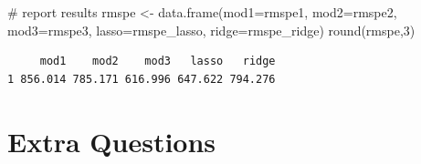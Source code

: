 \documentclass[
  letterpaper,
  DIV=11,
  numbers=noendperiod]{scrreprt}
\newenvironment{Shaded}{\begin{snugshade}}{\end{snugshade}}
\newcommand{\AttributeTok}[1]{\textcolor[rgb]{0.40,0.45,0.13}{#1}}
\newcommand{\CommentTok}[1]{\textcolor[rgb]{0.37,0.37,0.37}{#1}}
\newcommand{\DecValTok}[1]{\textcolor[rgb]{0.68,0.00,0.00}{#1}}
\newcommand{\FunctionTok}[1]{\textcolor[rgb]{0.28,0.35,0.67}{#1}}
\newcommand{\NormalTok}[1]{\textcolor[rgb]{0.00,0.23,0.31}{#1}}
\newcommand{\OtherTok}[1]{\textcolor[rgb]{0.00,0.23,0.31}{#1}}
\begin{document}
\begin{Shaded}
\begin{Highlighting}[]
\CommentTok{\# report results}
\NormalTok{rmspe }\OtherTok{\textless{}{-}} \FunctionTok{data.frame}\NormalTok{(}\AttributeTok{mod1=}\NormalTok{rmspe1, }\AttributeTok{mod2=}\NormalTok{rmspe2, }\AttributeTok{mod3=}\NormalTok{rmspe3, }\AttributeTok{lasso=}\NormalTok{rmspe\_lasso, }\AttributeTok{ridge=}\NormalTok{rmspe\_ridge)}
\FunctionTok{round}\NormalTok{(rmspe,}\DecValTok{3}\NormalTok{)}
\end{Highlighting}
\end{Shaded}

\begin{verbatim}
     mod1    mod2    mod3   lasso   ridge
1 856.014 785.171 616.996 647.622 794.276
\end{verbatim}

\section{Extra Questions}\label{extra-questions-4}
\end{document}
